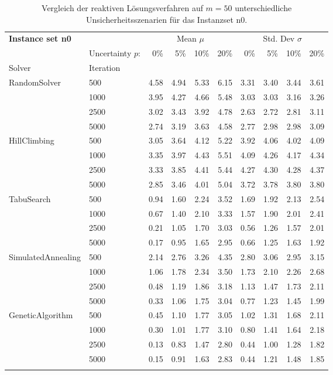{\footnotesize
\begin{longtable}{ll|rrrr|rrrr}
\toprule
\textbf{Instance set n0}                 & {} & \multicolumn{4}{c|}{Mean $\mu$} & \multicolumn{4}{c}{Std. Dev $\sigma$} \\
                & Uncertainty $p$: & 0\% & 5\% & 10\% & 20\% & 0\% & 5\% & 10\% & 20\% \\
Solver & Iteration &      &      &      &      &      &      &      &      \\
\midrule
RandomSolver & 500  & 4.58 & 4.94 & 5.33 & 6.15 & 3.31 & 3.40 & 3.44 & 3.61 \\
                 & 1000 & 3.95 & 4.27 & 4.66 & 5.48 & 3.03 & 3.03 & 3.16 & 3.26 \\
                 & 2500 & 3.02 & 3.43 & 3.92 & 4.78 & 2.63 & 2.72 & 2.81 & 3.11 \\
                 & 5000 & 2.74 & 3.19 & 3.63 & 4.58 & 2.77 & 2.98 & 2.98 & 3.09 \\ \hline
HillClimbing & 500  & 3.05 & 3.64 & 4.12 & 5.22 & 3.92 & 4.06 & 4.02 & 4.09 \\
                 & 1000 & 3.35 & 3.97 & 4.43 & 5.51 & 4.09 & 4.26 & 4.17 & 4.34 \\
                 & 2500 & 3.33 & 3.85 & 4.41 & 5.44 & 4.27 & 4.30 & 4.28 & 4.37 \\
                 & 5000 & 2.85 & 3.46 & 4.01 & 5.04 & 3.72 & 3.78 & 3.80 & 3.80 \\ \hline
TabuSearch & 500  & 0.94 & 1.60 & 2.24 & 3.52 & 1.69 & 1.92 & 2.13 & 2.54 \\
                 & 1000 & 0.67 & 1.40 & 2.10 & 3.33 & 1.57 & 1.90 & 2.01 & 2.41 \\
                 & 2500 & 0.21 & 1.05 & 1.70 & 3.03 & 0.56 & 1.26 & 1.57 & 2.01 \\
                 & 5000 & 0.17 & 0.95 & 1.65 & 2.95 & 0.66 & 1.25 & 1.63 & 1.92 \\ \hline
SimulatedAnnealing & 500  & 2.14 & 2.76 & 3.26 & 4.35 & 2.80 & 3.06 & 2.95 & 3.15 \\
                 & 1000 & 1.06 & 1.78 & 2.34 & 3.50 & 1.73 & 2.10 & 2.26 & 2.68 \\
                 & 2500 & 0.48 & 1.19 & 1.86 & 3.18 & 1.13 & 1.47 & 1.73 & 2.11 \\
                 & 5000 & 0.33 & 1.06 & 1.75 & 3.04 & 0.77 & 1.23 & 1.45 & 1.99 \\ \hline
GeneticAlgorithm & 500  & 0.45 & 1.10 & 1.77 & 3.05 & 1.02 & 1.31 & 1.68 & 2.11 \\
                 & 1000 & 0.30 & 1.01 & 1.77 & 3.10 & 0.80 & 1.41 & 1.64 & 2.18 \\
                 & 2500 & 0.13 & 0.83 & 1.47 & 2.80 & 0.44 & 1.00 & 1.28 & 1.82 \\
                 & 5000 & 0.15 & 0.91 & 1.63 & 2.83 & 0.44 & 1.21 & 1.48 & 1.85 \\
\bottomrule
\caption{Vergleich der reaktiven Lösungsverfahren auf $m=50$ unterschiedliche Unsicherheitsszenarien für das Instanzset n0. }
\label{tab:evaluation_reactive_n0}
\end{longtable}
}

